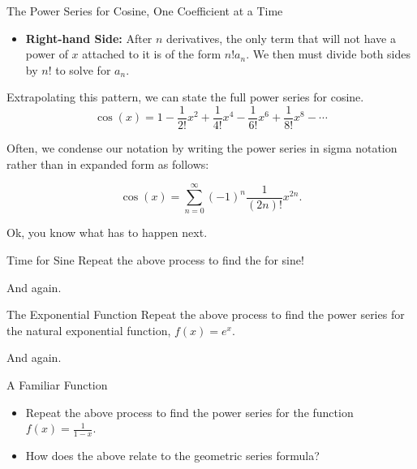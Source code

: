 \begin{example}{The Power Series for Cosine, One Coefficient at a Time}
\begin{itemize}
\item {\bf Right-hand Side:} After $n$ derivatives, the only term that will not have a power of $x$ attached to it is of the form $n!a_n$.  We then must divide both sides by $n!$ to solve for $a_n$. 
\end{itemize}

Extrapolating this pattern, we can state the full power series for cosine. $$\cos(x)=1-\frac{1}{2!}x^2+\frac{1}{4!}x^4-\frac{1}{6!}x^6+\frac{1}{8!}x^8-\cdots $$

Often, we condense our notation by writing the power series in sigma notation rather than in expanded form as follows:

$$ \cos(x)=\sum_{n=0}^\infty (-1)^{n}\frac{1}{\left(2n\right)!}x^{2n}.$$
\end{example}

\newpage

Ok, you know what has to happen next. 

\begin{exercise}{Time for Sine \Coffeecup \Coffeecup}
Repeat the above process to find the  for sine!

\vspace*{7in}
\end{exercise}

\newpage
And again.

\begin{exercise}{The Exponential Function \Coffeecup \Coffeecup}
Repeat the above process to find the power series for the natural exponential function, $f(x)=e^x$.
\vspace*{7in}
\end{exercise}

\newpage

And again.

\begin{exercise}{A Familiar Function \Coffeecup \Coffeecup}
\begin{itemize} \item Repeat the above process to find the power series for the function $f(x)=\frac{1}{1-x}$.

\vspace*{5.5in}
\item How does the above  relate to the geometric series formula?
\vspace*{1in}
\end{itemize}
\end{exercise}

